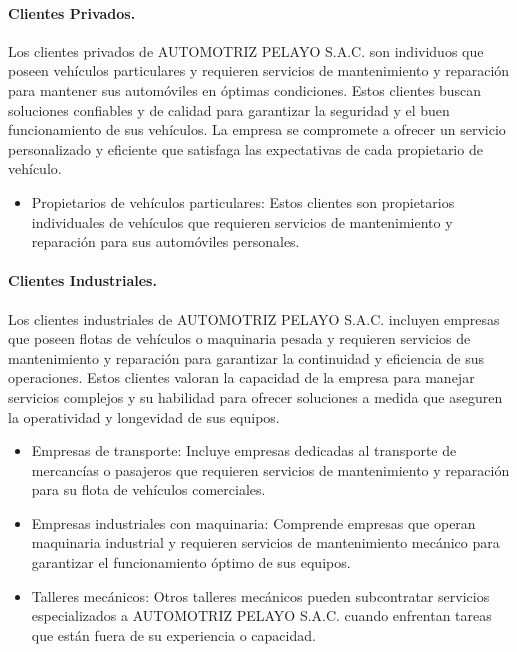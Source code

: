 \paragraph{Clientes Privados. }Los clientes privados de AUTOMOTRIZ PELAYO S.A.C. son individuos que poseen vehículos particulares y requieren servicios de mantenimiento y reparación para mantener sus automóviles en óptimas condiciones. Estos clientes buscan soluciones confiables y de calidad para garantizar la seguridad y el buen funcionamiento de sus vehículos. La empresa se compromete a ofrecer un servicio personalizado y eficiente que satisfaga las expectativas de cada propietario de vehículo.
 
\begin{itemize}
    \item Propietarios de vehículos particulares: Estos clientes son propietarios individuales de vehículos que requieren servicios de mantenimiento y reparación para sus automóviles personales.
\end{itemize}

\paragraph{Clientes Industriales. }Los clientes industriales de AUTOMOTRIZ PELAYO S.A.C. incluyen empresas que poseen flotas de vehículos o maquinaria pesada y requieren servicios de mantenimiento y reparación para garantizar la continuidad y eficiencia de sus operaciones. Estos clientes valoran la capacidad de la empresa para manejar servicios complejos y su habilidad para ofrecer soluciones a medida que aseguren la operatividad y longevidad de sus equipos.

\begin{itemize}
    \item Empresas de transporte: Incluye empresas dedicadas al transporte de mercancías o pasajeros que requieren servicios de mantenimiento y reparación para su flota de vehículos comerciales. 
    \item Empresas industriales con maquinaria: Comprende empresas que operan maquinaria industrial y requieren servicios de mantenimiento mecánico para garantizar el funcionamiento óptimo de sus equipos.
    \item Talleres mecánicos: Otros talleres mecánicos pueden subcontratar servicios especializados a AUTOMOTRIZ PELAYO S.A.C. cuando enfrentan tareas que están fuera de su experiencia o capacidad. 
\end{itemize}

